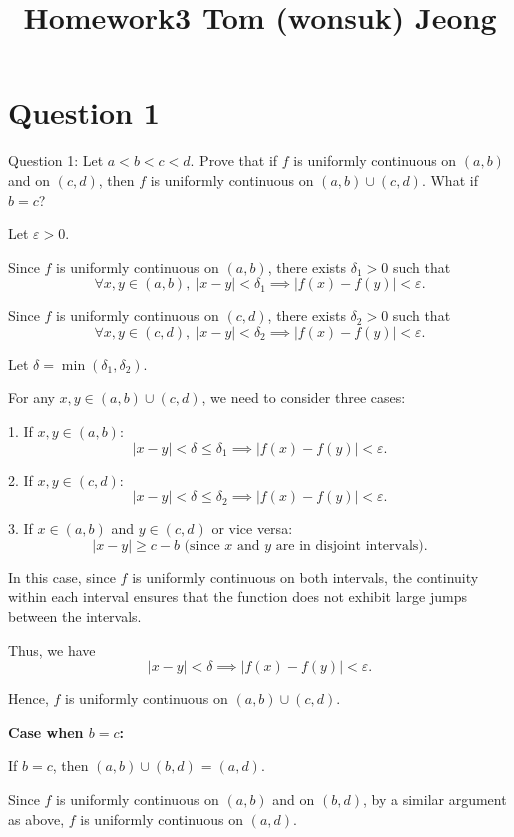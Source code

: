 \documentclass{article}
\begin{document}

\title{Homework3  Tom (wonsuk) Jeong  }
\maketitle
\section{Question 1} 


Question 1: Let $a < b < c < d$. Prove that if $f$ is uniformly continuous on $(a, b)$ and on $(c, d)$, then $f$ is uniformly continuous on $(a, b) \cup (c, d)$. What if $b = c$?
\begin{proofbox}
    Let $\varepsilon > 0$.

Since $f$ is uniformly continuous on $(a, b)$, there exists $\delta_1 > 0$ such that 
\[
\forall x, y \in (a, b), \ |x - y| < \delta_1 \implies |f(x) - f(y)| < \varepsilon.
\]

Since $f$ is uniformly continuous on $(c, d)$, there exists $\delta_2 > 0$ such that 
\[
\forall x, y \in (c, d), \ |x - y| < \delta_2 \implies |f(x) - f(y)| < \varepsilon.
\]

Let $\delta = \min(\delta_1, \delta_2)$. 

For any $x, y \in (a, b) \cup (c, d)$, we need to consider three cases:

1. If $x, y \in (a, b)$:
\[
|x - y| < \delta \leq \delta_1 \implies |f(x) - f(y)| < \varepsilon.
\]

2. If $x, y \in (c, d)$:
\[
|x - y| < \delta \leq \delta_2 \implies |f(x) - f(y)| < \varepsilon.
\]

3. If $x \in (a, b)$ and $y \in (c, d)$ or vice versa:
\[
|x - y| \geq c - b \text{ (since } x \text{ and } y \text{ are in disjoint intervals)}.
\]

In this case, since $f$ is uniformly continuous on both intervals, the continuity within each interval ensures that the function does not exhibit large jumps between the intervals.

Thus, we have
\[
|x - y| < \delta \implies |f(x) - f(y)| < \varepsilon.
\]

Hence, $f$ is uniformly continuous on $(a, b) \cup (c, d)$.

\textbf{Case when $b = c$:}

If $b = c$, then $(a, b) \cup (b, d) = (a, d)$. 

Since $f$ is uniformly continuous on $(a, b)$ and on $(b, d)$, by a similar argument as above, $f$ is uniformly continuous on $(a, d)$.

\end{proofbox}
\end{document}

